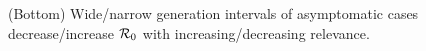 \begin{figure}[b!]
\begin{center}
{(Bottom) Wide/narrow generation intervals of asymptomatic cases decrease/increase ${\cal{R}}_0$ with increasing/decreasing relevance.
\label{fig.relevance}}
\end{center}
\end{figure}

